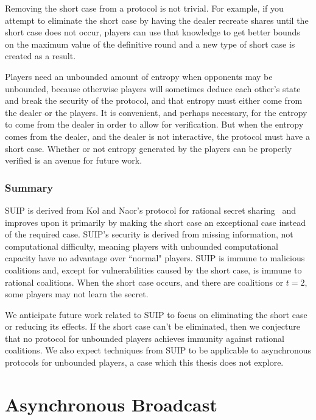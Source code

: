 \documentclass[12pt]{dalcsthesis}
\begin{document}
Removing the short case from a protocol is not trivial. For example, if you attempt to eliminate the short case by having the dealer recreate shares until the short case does not occur, players can use that knowledge to get better bounds on the maximum value of the definitive round and a new type of short case is created as a result.

Players need an unbounded amount of entropy when opponents may be unbounded, because otherwise players will sometimes deduce each other's state and break the security of the protocol, and that entropy must either come from the dealer or the players. It is convenient, and perhaps necessary, for the entropy to come from the dealer in order to allow for verification. But when the entropy comes from the dealer, and the dealer is not interactive, the protocol must have a short case. Whether or not entropy generated by the players can be properly verified is an avenue for future work.


\subsection{Summary}

SUIP is derived from Kol and Naor's protocol for rational secret sharing~\cite{kol08} and improves upon it primarily by making the short case an exceptional case instead of the required case. SUIP's security is derived from missing information, not computational difficulty, meaning players with unbounded computational capacity have no advantage over ``normal" players. SUIP is immune to malicious coalitions and, except for vulnerabilities caused by the short case, is immune to rational coalitions. When the short case occurs, and there are coalitions or $t=2$, some players may not learn the secret.

We anticipate future work related to SUIP to focus on eliminating the short case or reducing its effects. If the short case can't be eliminated, then we conjecture that no protocol for unbounded players achieves immunity against rational coalitions. We also expect techniques from SUIP to be applicable to asynchronous protocols for unbounded players, a case which this thesis does not explore.





\chapter{Asynchronous Broadcast}
\label{chapter:Asynchronous}
\end{document}
